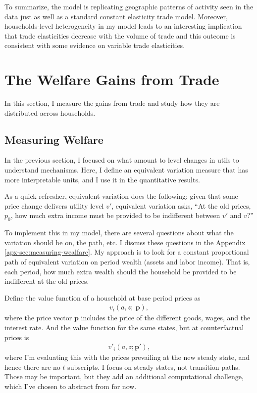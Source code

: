 \documentclass[12pt,pdftex]{article}
\begin{document}
\begin{onehalfspacing}
To summarize, the model is replicating geographic patterns of activity seen in the data just as well as a standard constant elasticity trade model. Moreover, households-level heterogeneity in my model leads to an interesting implication that trade elasticities decrease with the volume of trade and this outcome is consistent with some evidence on variable trade elasticities.

\section{The Welfare Gains from Trade}

In this section, I measure the gains from trade and study how they are distributed across households.

\subsection{Measuring Welfare}

In the previous section, I focused on what amount to level changes in utils to understand mechanisms. Here, I define an equivalent variation measure that has more interpretable units, and I use it in the quantitative results.

As a quick refresher, equivalent variation does the following: given that some price change delivers utility level $v'$, equivalent variation asks, ``At the old prices, $p_0$, how much extra income must be provided to be indifferent between $v'$ and $v$?''

To implement this in my model, there are several questions about what the variation should be on, the path, etc. I discuss these questions in the Appendix \ref{apx-sec:measuring-wealfare}. My approach is to look for a constant proportional path of equivalent variation on period wealth (assets and labor income). That is, each period, how much extra wealth should the household be provided to be indifferent at the old prices.

Define the value function of a household at base period prices as
\begin{align}
v_i(a, z ; \ \mathbf{p}),
\end{align}
where the price vector $\mathbf{p}$ includes the price of the different goods, wages, and the interest rate. And the value function for the same states, but at counterfactual prices is
\begin{align}
v'_i(a, z ; \mathbf{p'}), \label{eq:welfare-eqv-cftc}
\end{align}
where I'm evaluating this with the prices prevailing at the new steady state, and hence there are no $t$ subscripts. I focus on steady states, not transition paths. Those may be important, but they add an additional computational challenge, which I've chosen to abstract from for now.


\end{onehalfspacing}
\end{document}
